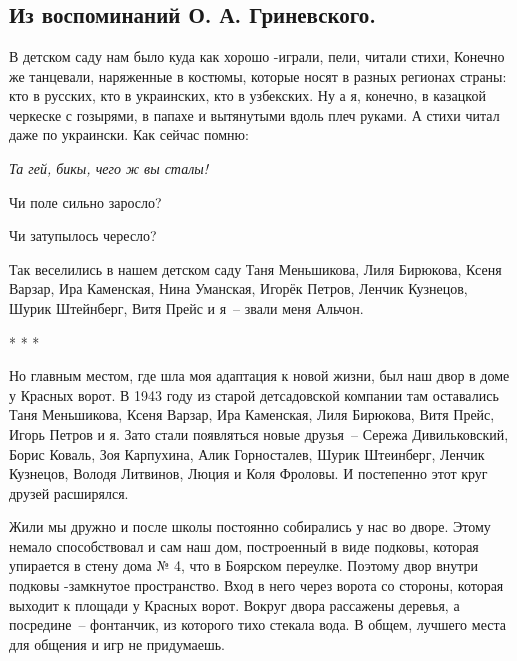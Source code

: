 \chapter{}

\section*{Из воспоминаний О. А. Гриневского.}

﻿В детском саду нам было куда как хорошо -играли, пели, читали стихи, Конечно же танцевали, наряженные в костюмы, которые носят в разных регионах страны: кто в русских, кто в украинских, кто в узбекских. Ну а я, конечно, в казацкой черкеске с гозырями, в папахе и вытянутыми вдоль плеч руками. А стихи читал даже по украински. Как сейчас помню: 

\indent

{\itshape
Та гей, бикы, чего ж вы сталы! 

Чи поле сильно заросло? 

Чи затупылось чересло?
}

\indent

Так  веселились  в  нашем  детском   саду  Таня  Меньшикова,   Лиля Бирюкова, Ксеня Варзар, Ира Каменская, Нина Уманская, Игорёк Петров, Ленчик Кузнецов, Шурик Штейнберг, Витя Прейс и я~-- звали меня Альчон. 

\indent

\begin{center} 
    * * *
\end{center}

\indent

Но главным местом, где шла моя адаптация к новой жизни, был наш двор в доме у Красных ворот. В 1943 году из старой детсадовской компании там оставались Таня Меньшикова, Ксеня Варзар, Ира Каменская, Лиля Бирюкова, Витя Прейс, Игорь Петров и я. Зато стали появляться новые друзья~-- Сережа Дивильковский, Борис Коваль, Зоя Карпухина, Алик Горносталев, Шурик Штеинберг, Ленчик Кузнецов, Володя Литвинов, Люция и Коля Фроловы. И постепенно этот круг друзей расширялся.

Жили мы дружно и после школы постоянно собирались у нас во дворе. Этому немало способствовал и сам наш дом, построенный в виде подковы, которая упирается в стену дома № 4, что в Боярском переулке. Поэтому двор внутри подковы -замкнутое пространство. Вход в него через ворота со стороны, которая выходит к площади у Красных ворот. Вокруг двора рассажены деревья, а посредине~-- фонтанчик, из которого тихо стекала вода. В общем, лучшего места для общения и игр не придумаешь.

